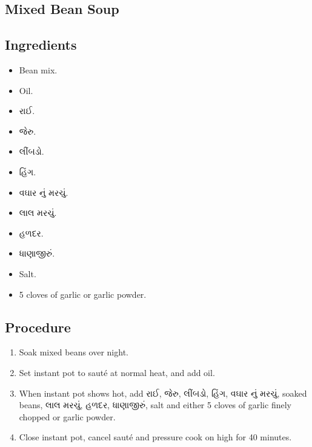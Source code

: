 \documentclass[../../recipes.tex]{subfiles}
\begin{document}
\begin{gujarati}

\chapter{Mixed Bean Soup}

\section*{Ingredients}

\begin{itemize}
    \item Bean mix.
    \item Oil.
    \item રાઈ.
    \item જેરુ.
    \item લીંબડો.
    \item હિંગ.
    \item વઘાર નું મરચું.
    \item લાલ મરચું.
    \item હળદર.
    \item ધાણાજીરું.
    \item Salt.
    \item 5 cloves of garlic or garlic powder.
\end{itemize}

\noindent
\section*{Procedure}

\begin{enumerate}
    \item Soak mixed beans over night.
    \item Set instant pot to sauté at normal heat, and add oil.
    \item When instant pot shows hot, add રાઈ, જેરુ, લીંબડો, હિંગ, વઘાર નું મરચું, soaked beans, લાલ મરચું, હળદર, ધાણાજીરું, salt and either 5 cloves of garlic finely chopped or garlic powder.
    \item Close instant pot, cancel sauté and pressure cook on high for 40 minutes.
\end{enumerate}

\end{gujarati}
\end{document}
